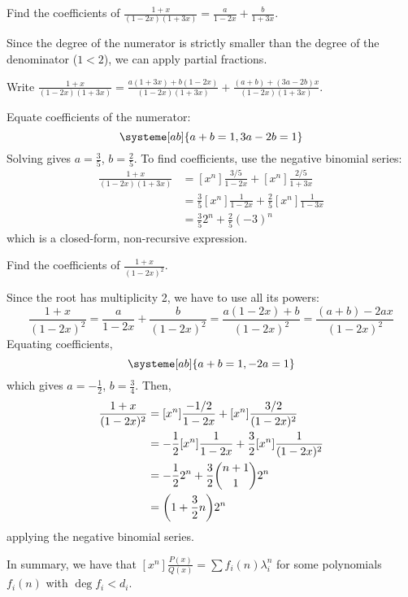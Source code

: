 \begin{example}
  Find the coefficients of $\frac{1+x}{(1-2x)(1+3x)} = \frac{a}{1-2x} + \frac{b}{1+3x}$.
\end{example}
\begin{sol}
  Since the degree of the numerator is strictly smaller than the degree of the denominator ($1 < 2$),
  we can apply partial fractions.

  Write $\frac{1+x}{(1-2x)(1+3x)} = \frac{a(1+3x) + b(1-2x)}{(1-2x)(1+3x)}
    + \frac{(a+b) + (3a-2b)x}{(1-2x)(1+3x)}$.

  Equate coefficients of the numerator:
  \[ \systeme[ab]{a+b=1,3a-2b=1} \]
  Solving gives $a = \frac35$, $b = \frac25$.
  To find coefficients, use the negative binomial series:
  \begin{align*}
    [x^n]\frac{1+x}{(1-2x)(1+3x)}
     & = [x^n]\frac{3/5}{1-2x} + [x^n]\frac{2/5}{1+3x}           \\
     & = \frac35[x^n]\frac{1}{1-2x} + \frac25[x^n]\frac{1}{1-3x} \\
     & = \frac352^n + \frac25(-3)^n
  \end{align*}
  which is a closed-form, non-recursive expression.
\end{sol}

\begin{example}
  Find the coefficients of $\frac{1+x}{(1-2x)^2}$.
\end{example}
\begin{sol}
  Since the root has multiplicity 2, we have to use all its powers:
  \[
    \frac{1+x}{(1-2x)^2} = \frac{a}{1-2x} + \frac{b}{(1-2x)^2}
    = \frac{a(1-2x) + b}{(1-2x)^2} = \frac{(a+b) - 2ax}{(1-2x)^2}
  \]
  Equating coefficients,
  \[ \systeme[ab]{a+b=1,-2a=1} \]
  which gives $a=-\frac12$, $b=\frac34$. Then,
  \begin{align*}
    [x^n]\frac{1+x}{(1-2x)^2}
     & = [x^n]\frac{-1/2}{1-2x} + [x^n]\frac{3/2}{(1-2x)^2}           \\
     & = -\frac12[x^n]\frac{1}{1-2x} + \frac32[x^n]\frac{1}{(1-2x)^2} \\
     & = -\frac12 2^n + \frac32\binom{n+1}{1}2^n                      \\
     & = \qty(1+\frac32n)2^n
  \end{align*}
  applying the negative binomial series.
\end{sol}

In summary, we have that $[x^n]\frac{P(x)}{Q(x)} = \sum f_i(n)\lambda_i^n$
for some polynomials $f_i(n)$ with $\deg f_i < d_i$.

